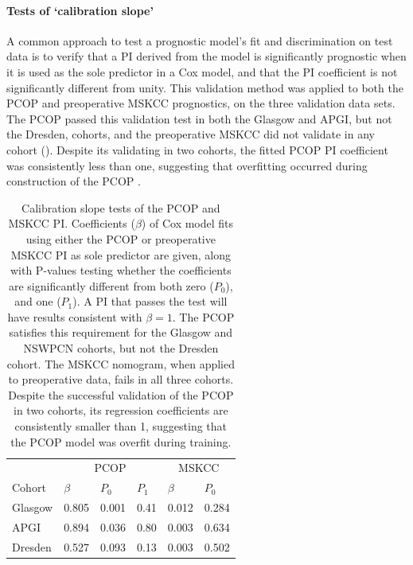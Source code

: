 \documentclass[dissertation.tex]{subfiles}
\begin{document}
\paragraph{Tests of `calibration slope'}
A common approach to test a prognostic model's fit and discrimination on test data is to verify that a \gls{PI} derived from the model is significantly prognostic when it is used as the sole predictor in a Cox model, and that the \gls{PI} coefficient is not significantly different from unity.  This validation method was applied to both the \gls{PCOP} and preoperative \gls{MSKCC} prognostics, on the three validation data sets.  The \gls{PCOP} passed this validation test in both the Glasgow and \gls{APGI}, but not the Dresden, cohorts, and the preoperative \gls{MSKCC} did not validate in any cohort ().  Despite its validating in two cohorts, the fitted \gls{PCOP} \gls{PI} coefficient was consistently less than one, suggesting that overfitting occurred during construction of the \gls{PCOP} \cite{Royston2013}.

\begin{table}[h]
\centering
\caption[Tests of \acrshort{PCOP} calibration slope]{Calibration slope tests of the \gls{PCOP} and \gls{MSKCC} \gls{PI}.  Coefficients ($\beta$) of Cox model fits using either the \gls{PCOP} or preoperative \gls{MSKCC} \gls{PI} as sole predictor are given, along with P-values testing whether the coefficients are significantly different from both zero ($P_0$), and one ($P_1$).  A \gls{PI} that passes the test will have results consistent with $\beta = 1$.  The \gls{PCOP} satisfies this requirement for the Glasgow and \gls{NSWPCN} cohorts, but not the Dresden cohort.  The \gls{MSKCC} nomogram, when applied to preoperative data, fails in all three cohorts.  Despite the successful validation of the \gls{PCOP} in two cohorts, its regression coefficients are consistently smaller than 1, suggesting that the \gls{PCOP} model was overfit during training.}\label{tab:nomo-val-slope}
\begin{tabular}{@{}llllll@{}}
\toprule
          & \multicolumn{3}{c}{PCOP}     & \multicolumn{2}{c}{MSKCC}  \\ \cmidrule(r){2-4} \cmidrule(r){5-6}
Cohort    & $\beta$  & $P_0$   & $P_1$   & $\beta$    & $P_0$         \\ \midrule
Glasgow   & 0.805    & 0.001   & 0.41    & 0.012      & 0.284         \\
APGI      & 0.894    & 0.036   & 0.80    & 0.003      & 0.634         \\
Dresden   & 0.527    & 0.093   & 0.13    & 0.003      & 0.502         \\ \bottomrule
\end{tabular}
\end{table}
\end{document}
